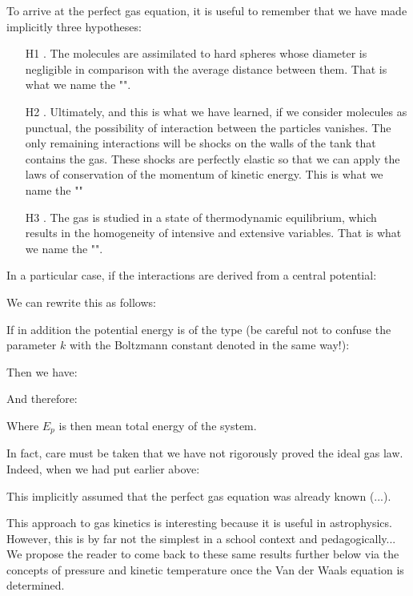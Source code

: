 	
	To arrive at the perfect gas equation, it is useful to remember that we have made implicitly three hypotheses:
	\begin{enumerate}
		\item[H1]. The molecules are assimilated to hard spheres whose diameter is negligible in comparison with the average distance between them. That is what we name the "".

		\item[H2]. Ultimately, and this is what we have learned, if we consider molecules as punctual, the possibility of interaction between the particles vanishes. The only remaining interactions will be shocks on the walls of the tank that contains the gas. These shocks are perfectly elastic so that we can apply the laws of conservation of the momentum of kinetic energy. This is what we name the ""

		\item[H3]. The gas is studied in a state of thermodynamic equilibrium, which results in the homogeneity of intensive and extensive variables. That is what we name the "".
	\end{enumerate}
	In a particular case, if the interactions are derived from a central potential:
	
	We can rewrite this as follows:
	
	If in addition the potential energy is of the type (be careful not to confuse the parameter $k$ with the Boltzmann constant denoted in the same way!):
	
	Then we have:
	
	And therefore:
	
	Where $E_p$ is then mean total energy of the system.
	
	In fact, care must be taken that we have not rigorously proved the ideal gas law. Indeed, when we had put earlier above:
	
	This implicitly assumed that the perfect gas equation was already known (...).

	This approach to gas kinetics is interesting because it is useful in astrophysics. However, this is by far not the simplest in a school context and pedagogically... We propose the reader to come back to these same results further below via the concepts of pressure and kinetic temperature once the Van der Waals equation is determined.

